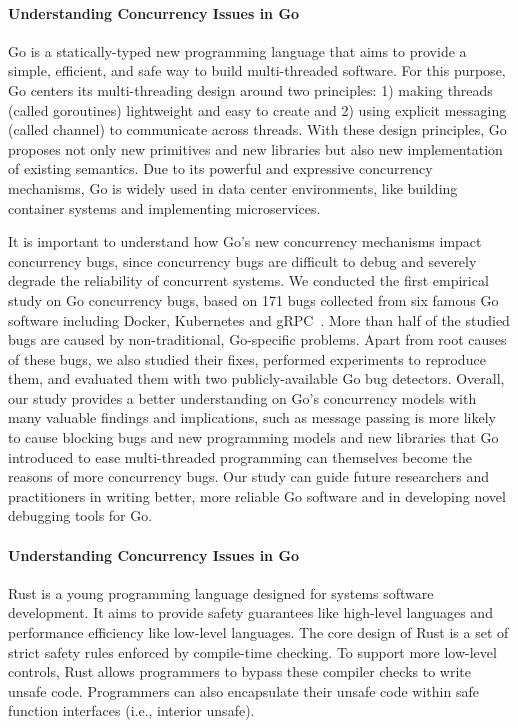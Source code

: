 \documentclass[10pt]{article}
\begin{document}
\vspace{-.1in}
\paragraph{Understanding Concurrency Issues in Go}
Go is a statically-typed new programming language that aims to provide 
a simple, efficient, and safe way to build multi-threaded software.
For this purpose, Go centers its multi-threading design 
around two principles: 1) making threads (called goroutines) lightweight 
and easy to create and 2) using explicit messaging (called channel) 
to communicate across threads. With these design principles, 
Go proposes not only new primitives and new libraries 
but also new implementation of existing semantics.
Due to its powerful and expressive concurrency mechanisms, 
Go is widely used in data center environments,
like building container systems and implementing microservices.

It is important to understand how Go's new concurrency mechanisms impact concurrency bugs, 
since concurrency bugs are difficult to debug and severely degrade 
the reliability of concurrent systems. 
We conducted the first empirical study on Go concurrency bugs, based on 171 bugs collected from  
six famous Go software 
including Docker, Kubernetes and gRPC~\cite{go-asplos}.
More than half of the studied bugs are caused by non-traditional, Go-specific problems. 
Apart from root causes of these bugs, we also studied their fixes, 
performed experiments to reproduce them, 
and evaluated them with two publicly-available Go bug detectors.
Overall, our study provides a better understanding on Go’s concurrency models
with many valuable findings and implications, such as message passing is more likely to 
cause blocking bugs and new programming models and new libraries 
that Go introduced to ease multi-threaded programming can themselves 
become the reasons of more concurrency bugs. 
Our study can guide future researchers and practitioners in writing better, 
more reliable Go software and in developing novel debugging tools for Go.

\vspace{-.1in}
\paragraph{Understanding Concurrency Issues in Go}
Rust is a young programming language designed for systems software development. 
It aims to provide safety guarantees like high-level languages and performance efficiency
like low-level languages. The core design of Rust is a set
of strict safety rules enforced by compile-time checking. To
support more low-level controls, Rust allows programmers
to bypass these compiler checks to write unsafe code. 
Programmers can also encapsulate their unsafe code within safe
function interfaces (i.e., interior unsafe).
\end{document}
